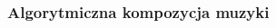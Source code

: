 \documentclass[]{beamer}
\begin{document}
\begin{frame}
\begin{multicols}{2}
  \end{multicols}
\end{frame}


\begin{frame}
  \frametitle{Algorytmiczna kompozycja muzyki}


\end{frame}
\end{document}
